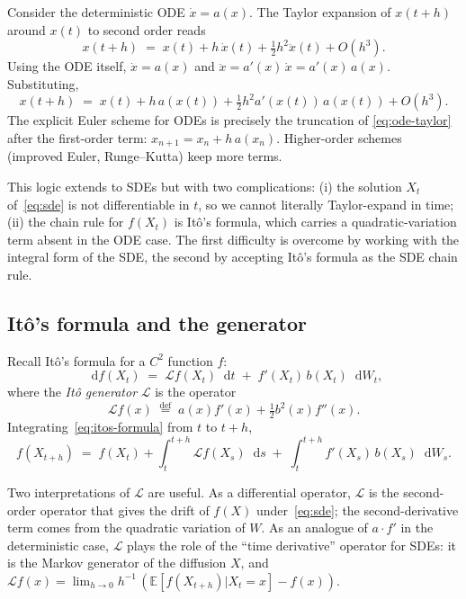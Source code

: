 \documentclass[11pt,a4paper]{article}
\theoremstyle{plain}
\theoremstyle{definition}
\theoremstyle{remark}
\newcommand{\E}{\mathbb{E}}
\newcommand{\dd}{\mathop{}\!\mathrm{d}}
\newcommand{\eqdef}{\overset{\mathrm{def}}{=}}
\newcommand{\Lop}{\mathcal{L}}
\begin{document}
Consider the deterministic ODE $\dot x = a(x)$. The Taylor expansion
of $x(t + h)$ around $x(t)$ to second order reads
\begin{equation}
x(t + h) \;=\; x(t) + h\, \dot x(t) + \tfrac{1}{2} h^2 \ddot x(t) + O(h^3).
\end{equation}
Using the ODE itself, $\dot x = a(x)$ and $\ddot x = a'(x)\, \dot x =
a'(x)\, a(x)$. Substituting,
\begin{equation}
\label{eq:ode-taylor}
x(t + h) \;=\; x(t) + h\, a(x(t)) + \tfrac{1}{2} h^2 a'(x(t))\, a(x(t))
+ O(h^3).
\end{equation}
The explicit Euler scheme for ODEs is precisely the truncation of
\eqref{eq:ode-taylor} after the first-order term:
$x_{n+1} = x_n + h\, a(x_n)$. Higher-order schemes (improved Euler,
Runge--Kutta) keep more terms.

This logic extends to SDEs but with two complications: (i) the
solution $X_t$ of~\eqref{eq:sde} is not differentiable in $t$, so we
cannot literally Taylor-expand in time; (ii) the chain rule for
$f(X_t)$ is It\^o's formula, which carries a quadratic-variation term
absent in the ODE case. The first difficulty is overcome by working
with the integral form of the SDE, the second by accepting It\^o's
formula as the SDE chain rule.

\subsection{It\^o's formula and the generator}
\label{sec:ito-and-generator}

Recall It\^o's formula for a $C^2$ function $f$:
\begin{equation}
\label{eq:itos-formula}
\dd f(X_t) \;=\;
\Lop f(X_t) \dd t \;+\; f'(X_t)\, b(X_t) \dd W_t,
\end{equation}
where the \emph{It\^o generator} $\Lop$ is the operator
\begin{equation}
\label{eq:generator}
\Lop f(x) \;\eqdef\; a(x) f'(x) + \tfrac{1}{2} b^2(x) f''(x).
\end{equation}
Integrating~\eqref{eq:itos-formula} from $t$ to $t + h$,
\begin{equation}
\label{eq:itos-integral}
f(X_{t+h}) \;=\; f(X_t) + \int_t^{t+h} \Lop f(X_s) \dd s
\;+\; \int_t^{t+h} f'(X_s)\, b(X_s) \dd W_s.
\end{equation}

Two interpretations of $\Lop$ are useful. As a differential operator,
$\Lop$ is the second-order operator that gives the drift of $f(X)$
under~\eqref{eq:sde}; the second-derivative term comes from the
quadratic variation of $W$. As an analogue of $a \cdot f'$ in the
deterministic case, $\Lop$ plays the role of the ``time derivative''
operator for SDEs: it is the Markov generator of the diffusion $X$,
and $\Lop f(x) = \lim_{h \to 0} h^{-1}\, (\E[f(X_{t+h}) | X_t = x] -
f(x))$.
\end{document}

